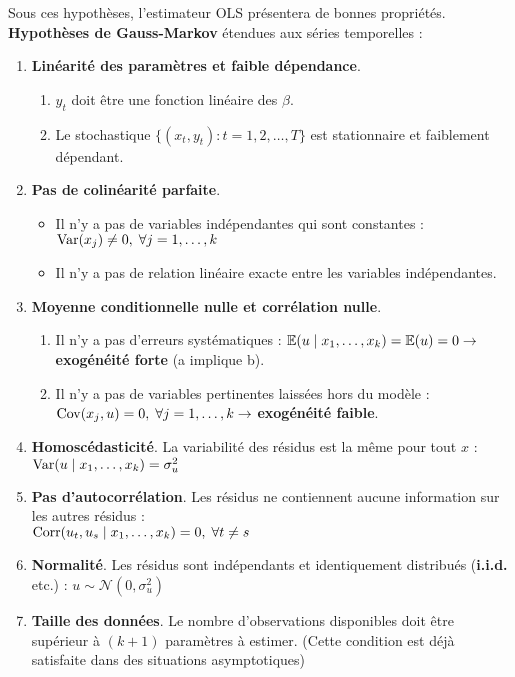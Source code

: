  \begin{f}

Sous ces hypothèses, l'estimateur OLS présentera de bonnes propriétés. \textbf{Hypothèses de Gauss-Markov} étendues aux séries temporelles :

\begin{enumerate}[leftmargin=*, label=t\arabic{*}.]
	\item \textbf{Linéarité des paramètres et faible dépendance}.
	
	\begin{enumerate}[leftmargin=*, label=\alph{*}.]
		\item $y_{t}$ doit être une fonction linéaire des $\beta$.
		\item Le stochastique $\lbrace( x_{t}, y_{t}) : t = 1, 2, \ldots, T \rbrace$ est stationnaire et faiblement dépendant.
	\end{enumerate}
	
	\item \textbf{Pas de colinéarité parfaite}.
	
	\begin{itemize}[leftmargin=*]
		\item Il n'y a pas de variables indépendantes qui sont constantes : $\mathrm{Var}(x_{j}) \neq 0, \; \forall j = 1, \ldots, k$
		\item Il n'y a pas de relation linéaire exacte entre les variables indépendantes.
	\end{itemize}
	
	\item \textbf{Moyenne conditionnelle nulle et corrélation nulle}.
	
	\begin{enumerate}[leftmargin=*, label=\alph{*}.]
		\item Il n'y a pas d'erreurs systématiques : $\mathbb{E}(u \mid x_{1}, \ldots, x_{k}) = \mathbb{E}(u) = 0 \rightarrow$ \textbf{exogénéité forte} (a implique b).
		\item Il n'y a pas de variables pertinentes laissées hors du modèle : $\mathrm{Cov}(x_{j} , u) = 0, \; \forall j = 1, \ldots, k \rightarrow$ \textbf{exogénéité faible}.
	\end{enumerate}
	
	\item \textbf{Homoscédasticité}. La variabilité des résidus est la même pour tout $x$ : $\mathrm{Var}(u \mid x_{1}, \ldots, x_{k}) = \sigma^{2}_{u}$
	\item \textbf{Pas d'autocorrélation}. Les résidus ne contiennent aucune information sur les autres résidus : \\
	$\mathrm{Corr}(u_{t}, u_{s} \mid x_{1}, \ldots, x_{k}) = 0, \; \forall t \neq s$
	\item \textbf{Normalité}. Les résidus sont indépendants et identiquement distribués (\textbf{i.i.d.} etc.) : $u \sim \mathcal{N}(0, \sigma^{2}_{u})$
	\item \textbf{Taille des données}. Le nombre d'observations disponibles doit être supérieur à $(k + 1)$ paramètres à estimer. (Cette condition est déjà satisfaite dans des situations asymptotiques)
\end{enumerate}

\end{f}    

